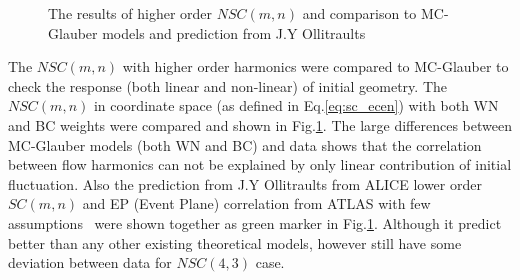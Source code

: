 \begin{figure}[h]
\begin{center}
        \caption{The results of  higher order $NSC(m,n)$ and comparison to MC-Glauber models and prediction from J.Y Ollitraults\cite{Giacalone:2016afq}  }
        \label{fig_sc_higher:glauber}
        \end{center}   
     \end{figure}

 The $NSC(m,n)$ with higher order harmonics were compared to MC-Glauber to check the response (both linear and non-linear) of initial geometry. The $NSC(m,n)$ in coordinate space (as defined in Eq.\ref{eq:sc_ecen}) with both WN and BC weights were compared and shown in Fig.\ref{fig_sc_higher:glauber}. The large differences between MC-Glauber models (both WN and BC) and data shows that the correlation between flow harmonics can not be explained by only linear contribution of initial fluctuation. Also the prediction from J.Y Ollitraults from ALICE lower order $SC(m,n)$ and EP (Event Plane) correlation from ATLAS with few assumptions~\cite{Giacalone:2016afq} were shown together as green marker in Fig.\ref{fig_sc_higher:glauber}. Although it predict better than any other existing theoretical models, however still have some deviation between data for $NSC(4,3)$ case.
 

